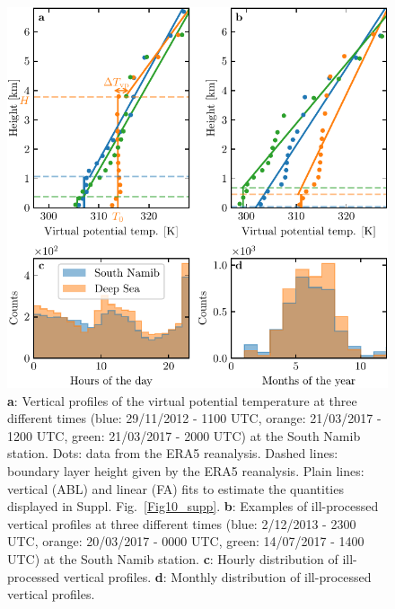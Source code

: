 \begin{figure}[p]
\centering
\includegraphics[scale=1]{Figures/Figure9_supp.pdf}
\caption{\textbf{a}: Vertical profiles of the virtual potential temperature at three different times (blue: 29/11/2012 - 1100 UTC, orange: 21/03/2017 - 1200 UTC, green: 21/03/2017 - 2000 UTC) at the South Namib station. Dots: data from the ERA5 reanalysis. Dashed lines: boundary layer height given by the ERA5 reanalysis. Plain lines: vertical (ABL) and linear (FA) fits to estimate the quantities displayed in Suppl. Fig.~\ref{Fig10_supp}. \textbf{b}: Examples of ill-processed vertical profiles at three different times (blue: 2/12/2013 - 2300 UTC, orange: 20/03/2017 - 0000 UTC, green: 14/07/2017 - 1400 UTC) at the South Namib station. \textbf{c}: Hourly distribution of ill-processed vertical profiles. \textbf{d}: Monthly distribution of ill-processed vertical profiles.}
\label{Fig9_supp}
\end{figure}

